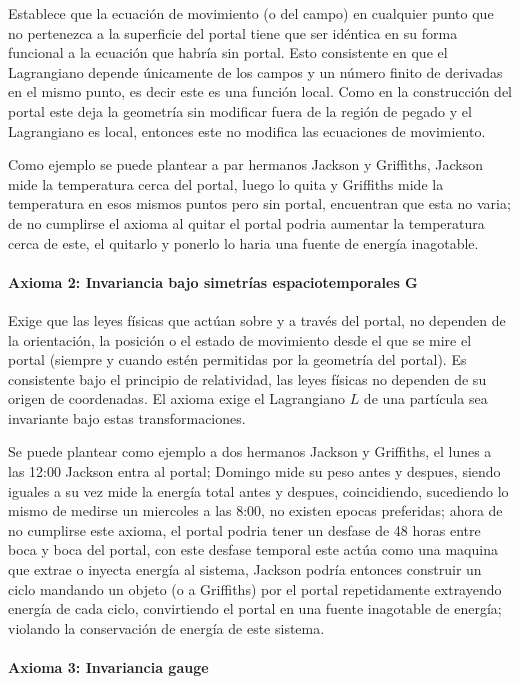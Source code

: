 \documentclass[12pt, twocolumn]{article}
\begin{document}
Establece que la ecuación de movimiento (o del campo) en cualquier punto que no pertenezca a la superficie del portal tiene que ser idéntica en su forma funcional a la ecuación que habría sin portal. Esto consistente en que el Lagrangiano depende únicamente de los campos y un número finito de derivadas en el mismo punto, es decir este es una función local. Como en la construcción del portal este deja la geometría sin modificar fuera de la región de pegado y el Lagrangiano es local, entonces este no modifica las ecuaciones de movimiento. 

Como ejemplo se puede plantear a par hermanos Jackson y Griffiths, Jackson mide la temperatura cerca del portal, luego lo quita y Griffiths mide la temperatura en esos mismos puntos pero sin portal, encuentran que esta no varia; de no cumplirse el axioma al quitar el portal podria aumentar la temperatura cerca de este, el quitarlo y ponerlo lo haria una fuente de energía inagotable.

\paragraph{Axioma 2: Invariancia bajo simetrías espaciotemporales G} Exige que las leyes físicas que actúan sobre y a través del portal, no dependen de la orientación, la posición o el estado de movimiento desde el que se mire el portal (siempre y cuando estén permitidas por la geometría del portal). Es consistente bajo el principio de relatividad, las leyes físicas no dependen de su origen de coordenadas. El axioma exige el Lagrangiano $L$ de una partícula sea invariante bajo estas transformaciones.

Se puede plantear como ejemplo a dos hermanos Jackson y Griffiths, el lunes a las 12:00 Jackson entra al portal; Domingo mide su peso antes y despues, siendo iguales a su vez mide la energía total antes y despues, coincidiendo, sucediendo lo mismo de medirse un miercoles a las 8:00, no existen epocas preferidas; ahora de no cumplirse este axioma, el portal podria tener un desfase de 48 horas entre boca y boca del portal, con este desfase temporal este actúa como una maquina que extrae o inyecta energía al sistema, Jackson podría entonces construir un ciclo mandando un objeto (o a Griffiths) por el portal repetidamente extrayendo energía de cada ciclo, convirtiendo el portal en una fuente inagotable de energía; violando la conservación de energía de este sistema.

\paragraph{Axioma 3: Invariancia gauge}
\end{document}
